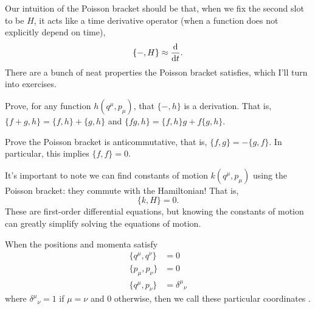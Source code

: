 Our intuition of the Poisson bracket should be that, when we fix the
second slot to be $H$, it acts like a time derivative operator (when a
function does not explicitly depend on time),
\begin{equation}
\{-,H\}\approx\frac{\mathrm{d}}{\mathrm{d} t}.
\end{equation}
There are a bunch of neat properties the Poisson bracket satisfies,
which I'll turn into exercises.

\begin{exercise}
Prove, for any function $h(q^{\mu}, p_{\mu})$, that $\{-,h\}$ is a
derivation. That is, $\{f + g, h\} = \{f, h\} + \{g, h\}$ and $\{fg,h\} = \{f,h\}g + f\{g,h\}$.
\end{exercise}

\begin{exercise}
Prove the Poisson bracket is anticommutative, that is, $\{f,g\}=-\{g,f\}$.
In particular, this implies $\{f,f\}=0.$
\end{exercise}

It's important to note we can find constants of motion $k(q^{\mu},p_{\mu})$
using the Poisson bracket: they commute with the Hamiltonian! That is,
\begin{equation}
\{k, H\} = 0.
\end{equation}
These are first-order differential equations, but knowing the constants
of motion can greatly simplify solving the equations of motion.

When the positions and momenta satisfy
\begin{align}
  \{q^{\mu},q^{\nu}\} &= 0\\
  \{p_{\mu},p_{\nu}\} &= 0\\
  \{q^{\mu},p_{\nu}\} &= {\delta^{\mu}}_{\nu}
\end{align}
where ${\delta^{\mu}}_{\nu} = 1$ if $\mu=\nu$ and $0$ otherwise, then we
call these particular coordinates .

